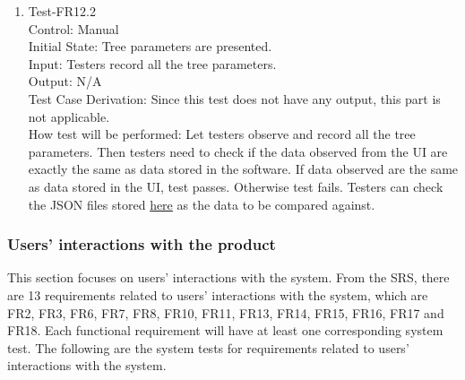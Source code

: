 \documentclass[12pt, titlepage]{article}
\begin{document}
\begin{enumerate}
\item{Test-FR12.2\\}
Control: Manual\\ 

Initial State: Tree parameters are presented.\\

Input: Testers record all the tree parameters.\\

Output: N/A\\

Test Case Derivation: Since this test does not have any output, this part is
not applicable.\\
					
How test will be performed: Let testers observe and record all the 
tree parameters. Then testers need to check if the data observed
from the UI are exactly the same as data stored in the software. 
If data observed are the same as data stored in the UI, test passes.
Otherwise test fails. Testers can check the JSON files stored 
\href{https://github.com/tingyushi/DTForest-DS}{here}
as the data to be compared against. 


\end{enumerate}

\subsubsection{Users' interactions with the product}
This section focuses on users' interactions with the system. 
From the SRS, there are 13 requirements related to users' interactions
with the system, which
are FR2, FR3, FR6, FR7, FR8, FR10, FR11, FR13, FR14, FR15, FR16, FR17 and FR18.
Each functional requirement will have at least one 
corresponding system test. The following are the system tests for requirements
related to users' interactions with the system.
\end{document}
